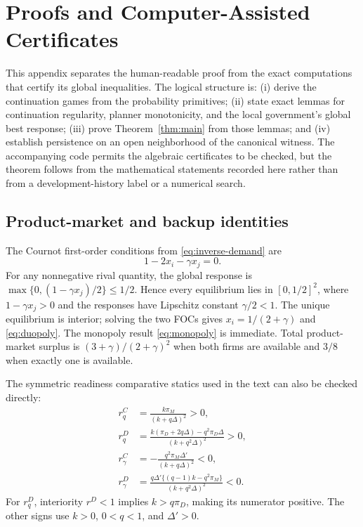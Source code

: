 \section{Proofs and Computer-Assisted Certificates}\label{app:verification}

This appendix separates the human-readable proof from the exact computations that certify its global inequalities. The logical structure is: (i) derive the continuation games from the probability primitives; (ii) state exact lemmas for continuation regularity, planner monotonicity, and the local government's global best response; (iii) prove Theorem~\ref{thm:main} from those lemmas; and (iv) establish persistence on an open neighborhood of the canonical witness. The accompanying code permits the algebraic certificates to be checked, but the theorem follows from the mathematical statements recorded here rather than from a development-history label or a numerical search.

\subsection{Product-market and backup identities}

The Cournot first-order conditions from \eqref{eq:inverse-demand} are
\begin{equation}
1-2x_i-\gamma x_j=0.
\end{equation}
For any nonnegative rival quantity, the global response is $\max\{0,(1-\gamma x_j)/2\}\leq1/2$. Hence every equilibrium lies in $[0,1/2]^2$, where $1-\gamma x_j>0$ and the responses have Lipschitz constant $\gamma/2<1$. The unique equilibrium is interior; solving the two FOCs gives $x_i=1/(2+\gamma)$ and \eqref{eq:duopoly}. The monopoly result \eqref{eq:monopoly} is immediate. Total product-market surplus is $(3+\gamma)/(2+\gamma)^2$ when both firms are available and $3/8$ when exactly one is available.

The symmetric readiness comparative statics used in the text can also be checked directly:
\begin{align*}
r^C_q&=\frac{k\pi_M}{(k+q\Delta)^2}>0,\\
r^D_q&=\frac{k(\pi_D+2q\Delta)-q^2\pi_D\Delta}{(k+q^2\Delta)^2}>0,\\
r^C_\gamma&=-\frac{q^2\pi_M\Delta'}{(k+q\Delta)^2}<0,\\
r^D_\gamma&=\frac{q\Delta'\{(q-1)k-q^2\pi_M\}}{(k+q^2\Delta)^2}<0.
\end{align*}
For $r^D_q$, interiority $r^D<1$ implies $k>q\pi_D$, making its numerator positive. The other signs use $k>0$, $0<q<1$, and $\Delta'>0$.

